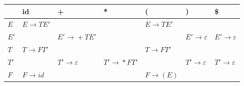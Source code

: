 \documentclass{standalone}
\providecommand\lightrule{%
	\arrayrulecolor{black!30}%
	\midrule[\lightrulewidth]%
	\arrayrulecolor{black}}
\begin{document}
\begin{tabularx}{\textwidth}{m|X|X|X|X|b|b}
    & id & + & * & ( & ) & \$ \\
    \midrule
        \(E\)
        &
        \(E\! \to\! TE'\)
        & & &
        \(E\! \to\! TE'\)
        & &

        \\ \lightrule

        \(E'\)
        & &
        \(E'\! \to\! + TE'\)
        & & &
        \(E'\! \to\! \varepsilon\)
        &
        \(E'\! \to\! \varepsilon\)

        \\ \lightrule

        \(T\)
        &
        \(T\! \to\! FT'\)
        & & &
        \(T\! \to\! FT'\)
        & &

        \\ \lightrule

        \(T'\)
        & &
        \(T'\! \to\! \varepsilon\)
        &
        \(T'\! \to\! \ast FT'\)
        & & 
        \(T'\! \to\! \varepsilon\)
        &
        \(T'\! \to\! \varepsilon\)

        \\ \lightrule

        \(F\)
        &
        \(F\! \to\! id\)
        & & &
        \(F\! \to\! (E)\)
        & & 
        \\
\end{tabularx}
\end{document}
